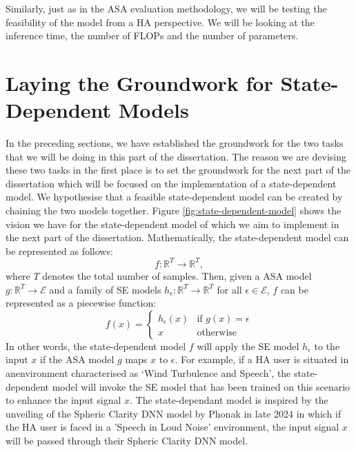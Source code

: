 \documentclass[logo,bsc,singlespacing,parskip,online]{infthesis}
\begin{document}
Similarly, just as in the ASA evaluation methodology, we will be testing the feasibility of the model 
from a HA perspective. We will be looking at the inference time, the number of FLOPs and the number of parameters.

\section{Laying the Groundwork for State-Dependent Models}
In the preceding sections, we have established the groundwork for the two tasks that we will be doing in this part of the dissertation.
The reason we are devising these two tasks in the first place is to set the groundwork for the next part of the dissertation which 
will be focused on the implementation of a state-dependent model. We hypothesise that a feasible state-dependent model can be created 
by chaining the two models together. Figure \ref{fig:state-dependent-model} shows the vision we have for the state-dependent model 
of which we aim to implement in the next part of the dissertation.
Mathematically, the state-dependent model can be represented as follows:
\[
f: \mathbb{R}^{T} \to \mathbb{R}^{T},
\]
where \(T\) denotes the total number of samples. 
Then, given a ASA model $g : \mathbb{R}^{T} \to \mathcal{E}$ and a family of SE models $h_{\epsilon} : \mathbb{R}^{T} \to \mathbb{R}^{T}$ for all $\epsilon \in \mathcal{E}$, 
$f$ can be represented as a piecewise function:
\begin{equation}
   f(x) = 
   \begin{cases} 
      h_{\epsilon}(x) & \text{if } g(x) = \epsilon \\
      x & \text{otherwise}
   \end{cases}
\end{equation}
In other words, the state-dependent model $f$ will apply the SE model $h_{\epsilon}$ to the input $x$ if the ASA model $g$ maps $x$ to $\epsilon$.
For example, if a HA user is situated in anenvironment characterised as `Wind Turbulence and Speech',
the state-dependent model will invoke the SE model that has been trained on this scenario to enhance the input signal $x$.
The state-dependant model is inspired by the unveiling of the Spheric Clarity DNN model by Phonak \cite{Hasemann2024PhonakSphere} in late 2024
in which if the HA user is faced in a 'Speech in Loud Noise' environment, the input signal $x$ will be passed through their Spheric Clarity DNN model.

\end{document}
